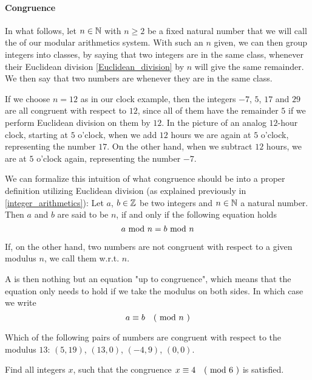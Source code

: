 \paragraph{Congruence}
In what follows, let $n\in\mathbb{N}$ with $n\geq 2$ be a fixed natural number that we will call the  of our modular arithmetics system. With such an $n$ given, we can then group integers into classes, by saying that two integers are in the same class, whenever their Euclidean division \ref{Euclidean_division} by $n$ will give the same remainder. We then say that two numbers are  whenever they are in the same class.

\begin{example}
If we choose $n=12$ as in our clock example, then the integers $-7$, $5$, $17$ and $29$ are all congruent with respect to $12$, since all of them have the remainder $5$ if we perform Euclidean division on them by $12$. In the picture of an analog $12$-hour clock, starting at $5$ o'clock, when we add $12$ hours we are again at $5$ o'clock, representing the number $17$. On the other hand, when we subtract $12$ hours, we are at $5$ o'clock again, representing the number $-7$. 
\end{example}
We can formalize this intuition of what congruence should be into a proper definition utilizing Euclidean division (as explained previously in \ref{integer_arithmetics}): Let $ a $, $ b \in \mathbb{Z} $ be two integers and $ n \in \mathbb{N} $ a natural number.
Then $ a $ and $ b $ are said to be  $ n $, if and only if the following equation holds
\begin{equation}
a \text{ mod } n = b \text{ mod } n
\end{equation}

If, on the other hand, two numbers are not congruent with respect to a given modulus $n$, we call them  w.r.t. $n$. 

A  is then nothing but an equation "up to congruence", which means that the equation only needs to hold if we take the modulus on both sides. In which case we write 
\begin{equation}
a \equiv b \quad \text{( mod } n \text{ )} 
\end{equation}
\begin{exercise}
Which of the following pairs of numbers are congruent with respect to the modulus $13$: 
$(5,19)$, $(13,0)$, $(-4,9)$, $(0,0)$.
\end{exercise}
\begin{exercise}
Find all integers $x$, such that the congruence $x \equiv 4 \quad \text{( mod } 6 \text{ )}$ is satisfied.
\end{exercise}
